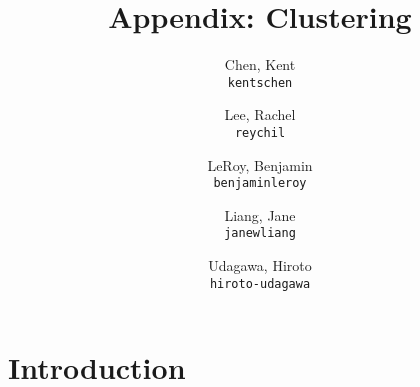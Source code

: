\documentclass[11pt]{article}
\title{Appendix: Clustering}
\author{
  Chen, Kent\\
  \texttt{kentschen}
  \and
  Lee, Rachel\\
  \texttt{reychil}
  \and
  LeRoy, Benjamin\\
  \texttt{benjaminleroy}
  \and
  Liang, Jane\\
  \texttt{janewliang}
  \and
  Udagawa, Hiroto\\
  \texttt{hiroto-udagawa}
}
\begin{document}
\maketitle

\section{Introduction}



\end{document}
